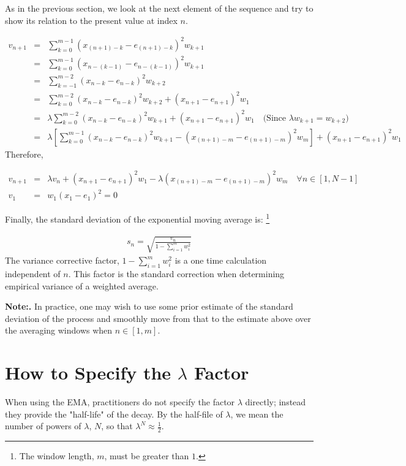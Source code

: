 \documentclass{article}
\begin{document}
As in the previous section, we look at the next element of the sequence 
and try to show its relation to the present value at index $n$.

\begin{eqnarray*}
v_{n+1} & = & \sum_{k=0}^{m-1} (x_{(n+1)-k} - e_{(n+1)-k})^2  w_{k+1} \\
        & = & \sum_{k=0}^{m-1} (x_{n-(k-1)} - e_{n-(k-1)})^2  w_{k+1} \\
        & = & \sum_{k=-1}^{m-2} (x_{n-k} - e_{n-k})^2  w_{k+2} \\
        & = & \sum_{k=0}^{m-2} (x_{n-k} - e_{n-k})^2  w_{k+2}  + ( x_{n+1} - e_{n+1} )^2 w_1 \\
        & = & \lambda \sum_{k=0}^{m-2} (x_{n-k} - e_{n-k})^2  w_{k+1}  + ( x_{n+1} - e_{n+1} )^2 w_1  \quad \text{(Since $\lambda w_{k+1} = w_{k+2}$)} \\
        & = & \lambda \left[ \sum_{k=0}^{m-1} (x_{n-k} - e_{n-k})^2  w_{k+1} - ( x_{(n+1)-m} - e_{(n+1)-m} )^2 w_m \right]
            + ( x_{n+1} - e_{n+1} )^2 w_1 
\end{eqnarray*}
Therefore,

\begin{eqnarray}
    v_{n+1} & = & \lambda v_n + ( x_{n+1} - e_{n+1} )^2 w_1 - \lambda ( x_{(n+1)-m} - e_{(n+1)-m} )^2 w_m \quad \forall n \in [1, N-1] \\
    v_1  & = & w_1 (x_1 - e_1)^2 = 0
\end{eqnarray}

Finally, the standard deviation of the exponential moving average is:%
\footnote{The window length, $m$, must be greater than $1$.}

\begin{eqnarray}
    s_{n} = \sqrt{\frac{v_n}{1 - \sum_{i=1}^m w_i^2}} 
\end{eqnarray}
The variance corrective factor, $1 - \sum_{i=1}^m w_i^2$ is a 
one time calculation independent of $n$. This factor is the standard 
correction when determining empirical variance of a weighted average.

{\bf Note:\/.} In practice, one may wish to use some prior estimate of the standard deviation of the process
and smoothly move from that to the estimate above over the averaging windows when $n \in [1, m]$.


\section{How to Specify the $\lambda$ Factor}
When using the EMA, practitioners do not specify the factor $\lambda$ directly; 
instead they provide the "half-life" of the decay.
By the half-file of $\lambda$, we mean the number of powers of $\lambda$, $N$, so that
$\lambda^N \approx \frac{1}{2}$. 
\end{document}
